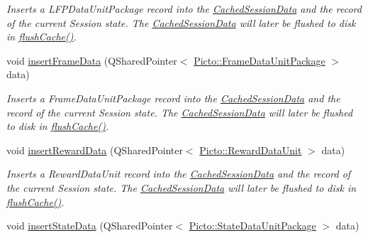 \begin{DoxyCompactItemize}
\begin{DoxyCompactList}\small\item\em Inserts a L\-F\-P\-Data\-Unit\-Package record into the \hyperlink{class_cached_session_data}{Cached\-Session\-Data} and the record of the current Session state. The \hyperlink{class_cached_session_data}{Cached\-Session\-Data} will later be flushed to disk in \hyperlink{class_session_info_af4106254bbe6282aae6e79e3b92ece2b}{flush\-Cache()}. \end{DoxyCompactList}\item 
\hypertarget{class_session_info_ae620bf3e111e9e659ff1988b78daea8c}{void \hyperlink{class_session_info_ae620bf3e111e9e659ff1988b78daea8c}{insert\-Frame\-Data} (Q\-Shared\-Pointer$<$ \hyperlink{class_picto_1_1_frame_data_unit_package}{Picto\-::\-Frame\-Data\-Unit\-Package} $>$ data)}\label{class_session_info_ae620bf3e111e9e659ff1988b78daea8c}

\begin{DoxyCompactList}\small\item\em Inserts a Frame\-Data\-Unit\-Package record into the \hyperlink{class_cached_session_data}{Cached\-Session\-Data} and the record of the current Session state. The \hyperlink{class_cached_session_data}{Cached\-Session\-Data} will later be flushed to disk in \hyperlink{class_session_info_af4106254bbe6282aae6e79e3b92ece2b}{flush\-Cache()}. \end{DoxyCompactList}\item 
\hypertarget{class_session_info_ae0e9984f6cfa55ef52307bf3fb6eed77}{void \hyperlink{class_session_info_ae0e9984f6cfa55ef52307bf3fb6eed77}{insert\-Reward\-Data} (Q\-Shared\-Pointer$<$ \hyperlink{class_picto_1_1_reward_data_unit}{Picto\-::\-Reward\-Data\-Unit} $>$ data)}\label{class_session_info_ae0e9984f6cfa55ef52307bf3fb6eed77}

\begin{DoxyCompactList}\small\item\em Inserts a Reward\-Data\-Unit record into the \hyperlink{class_cached_session_data}{Cached\-Session\-Data} and the record of the current Session state. The \hyperlink{class_cached_session_data}{Cached\-Session\-Data} will later be flushed to disk in \hyperlink{class_session_info_af4106254bbe6282aae6e79e3b92ece2b}{flush\-Cache()}. \end{DoxyCompactList}\item 
\hypertarget{class_session_info_ae18c0245152db810b0efb443c08b0f1d}{void \hyperlink{class_session_info_ae18c0245152db810b0efb443c08b0f1d}{insert\-State\-Data} (Q\-Shared\-Pointer$<$ \hyperlink{class_picto_1_1_state_data_unit_package}{Picto\-::\-State\-Data\-Unit\-Package} $>$ data)}\label{class_session_info_ae18c0245152db810b0efb443c08b0f1d}


\end{DoxyCompactItemize}
